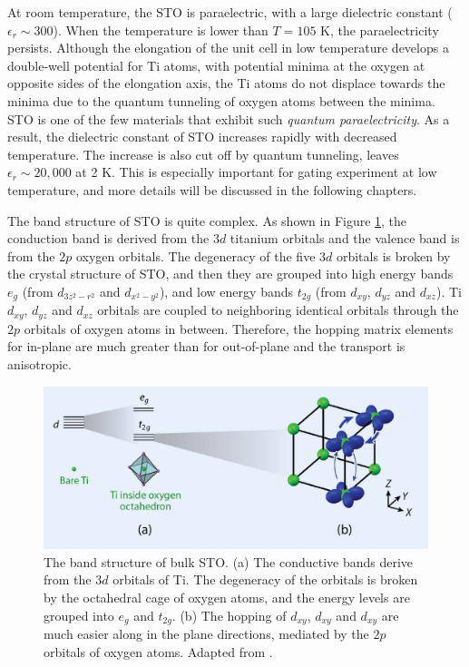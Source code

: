 \documentclass[pdflatex, sectionletters, 12pt, final, phd]{pittetd}    %
\begin{document}
At room temperature, the STO is paraelectric, with a large dielectric constant ($\epsilon_r \sim 300$).  When the temperature is lower than $T=105$ K, the paraelectricity persists. Although the elongation of the unit cell in low temperature develops a double-well potential for Ti atoms, with potential minima at the oxygen at opposite sides of the elongation axis, the Ti atoms do not displace towards the minima due to the quantum tunneling of oxygen atoms\cite{sulpizio2014nanoscale} between the minima. STO is one of the few materials that exhibit such \emph{quantum paraelectricity}\cite{muller1979srti}. As a result, the dielectric constant of STO increases rapidly with decreased temperature. The increase is also cut off by quantum tunneling, leaves $\epsilon_r \sim 20,000$\cite{sakudo1971dielectric} at 2 K. This is especially important for gating experiment at low temperature, and more details will be discussed in the following chapters.

The band structure of STO is quite complex. As shown in Figure \ref{FIG:STOBand}, the conduction band is derived from the $3d$ titanium orbitals and the valence band is from the $2p$ oxygen orbitals. The degeneracy of the five $3d$ orbitals is broken by the crystal structure of STO, and then they are grouped into high energy bands $e_g$ (from $d_{3z^2 - r^2}$ and $d_{x^2-y^2}$), and low energy bands $t_{2g}$ (from $d_{xy}$, $d_{yz}$ and $d_{xz}$). Ti $d_{xy}$, $d_{yz}$ and $d_{xz}$ orbitals are coupled to neighboring identical orbitals through the $2p$ orbitals of oxygen atoms in between. Therefore, the hopping matrix elements for in-plane are much greater than for out-of-plane and the transport is anisotropic\cite{sulpizio2014nanoscale}. 

\begin{figure}[h!]
	\centering
	\includegraphics[width=.90\textwidth]{Drawing/STOBand.pdf}
	\caption[The band structure of bulk STO]{The band structure of bulk STO. (a) The conductive bands derive from the $3d$ orbitals of Ti. The degeneracy of the orbitals is broken by the octahedral cage of oxygen atoms, and the energy levels are grouped into $e_g$ and $t_{2g}$. (b) The hopping of $d_{xy}$, $d_{xy}$ and $d_{xy}$ are much easier along in the plane directions, mediated by the $2p$ orbitals of oxygen atoms. Adapted from \cite{sulpizio2014nanoscale}.}
	\label{FIG:STOBand}
\end{figure}
\end{document}
